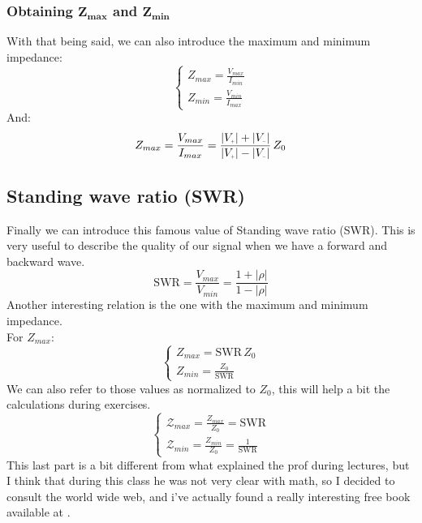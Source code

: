 \subsubsection*{Obtaining $\bm{Z_{max}}$ and $\bm{Z_{min}}$}
With that being said, we can also introduce the maximum and minimum\\
impedance:
\begin{equation}
    \begin{cases}
        Z_{max} = \frac{V_{max}}{I_{min}}\\
        Z_{min} = \frac{V_{min}}{I_{max}}
    \end{cases}
\end{equation}
And:
\begin{equation}
    Z_{max}=\frac{V_{max}}{I_{max}}=\frac{|V\bottomPlus|+|V\bottomMinus|}{|V\bottomPlus|-|V\bottomMinus|}\,Z_0
\end{equation}
\subsection*{Standing wave ratio (SWR)}
Finally we can introduce this famous value of Standing wave ratio (SWR). This is very useful to describe the quality of our signal when we have a forward and backward wave.
\begin{equation}\label{eq:swr_def}
    \text{SWR}=\frac{V_{max}}{V_{min}}=\frac{1+|\rho|}{1-|\rho|}
\end{equation}
Another interesting relation is the one with the maximum and minimum\\
impedance.\\
For $Z_{max}$:
\begin{equation}
    \begin{cases}
        Z_{max} = \text{SWR}\,Z_0 \\
        Z_{min} = \frac{Z_0}{\text{SWR}}
    \end{cases}
\end{equation}
We can also refer to those values as normalized to $Z_0$, this will help a bit the calculations during exercises.
\begin{equation}
    \begin{cases}\label{eq:normalized_impedance}
        \mathcal{Z}_{max} = \frac{Z_{max}}{Z_0}=\text{SWR}\\
        \mathcal{Z}_{min} = \frac{Z_{min}}{Z_0}=\frac{1}{\text{SWR}}
    \end{cases}
\end{equation}
This last part is a bit different from what explained the prof during lectures, but I think that during this class he was not very clear with math, so I decided to consult the world wide web, and i've actually found a really interesting free book available at \cite{Ellingson2020Book}.
